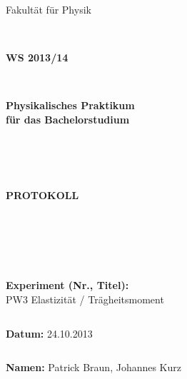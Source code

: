 \documentclass[12pt,a4paper]{article}
\begin{document}
\thispagestyle{empty}
			\begin{center}
			\Large{Fakultät für Physik}\\
			\end{center}
\begin{verbatim}


\end{verbatim}
			\begin{center}
			\textbf{\LARGE WS 2013/14}
			\end{center}
\begin{verbatim}


\end{verbatim}
			\begin{center}
			\textbf{\LARGE{Physikalisches Praktikum\\ für das Bachelorstudium}}
			\end{center}
\begin{verbatim}




\end{verbatim}

			\begin{center}
			\textbf{\LARGE{PROTOKOLL}}
			\end{center}
			
\begin{verbatim}





\end{verbatim}

			\begin{flushleft}
			\textbf{\Large{Experiment (Nr., Titel):}}\\
			\LARGE{PW3 Elastizität / Trägheitsmoment}	
			\end{flushleft}

\begin{verbatim}

\end{verbatim}	
			\begin{flushleft}
			\textbf{\Large{Datum:}} \Large{24.10.2013}
			\end{flushleft}
			
\begin{verbatim}
\end{verbatim}
		\begin{flushleft}
			\textbf{\Large{Namen:}} \Large{Patrick Braun, Johannes Kurz}
			\end{flushleft}
\end{document}
